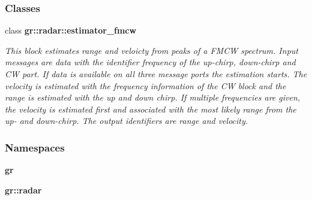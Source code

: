 \subsubsection*{Classes}
\begin{DoxyCompactItemize}
\item 
class {\bf gr\+::radar\+::estimator\+\_\+fmcw}
\begin{DoxyCompactList}\small\item\em This block estimates range and veloicty from peaks of a F\+M\+CW spectrum. Input messages are data with the identifier \textquotesingle{}frequency\textquotesingle{} of the up-\/chirp, down-\/chirp and CW part. If data is available on all three message ports the estimation starts. The velocity is estimated with the frequency information of the CW block and the range is estimated with the up and down chirp. If multiple frequencies are given, the velocity is estimated first and associated with the most likely range from the up-\/ and down-\/chirp. The output identifiers are \textquotesingle{}range\textquotesingle{} and \textquotesingle{}velocity\textquotesingle{}. \end{DoxyCompactList}\end{DoxyCompactItemize}
\subsubsection*{Namespaces}
\begin{DoxyCompactItemize}
\item 
 {\bf gr}
\item 
 {\bf gr\+::radar}
\end{DoxyCompactItemize}
